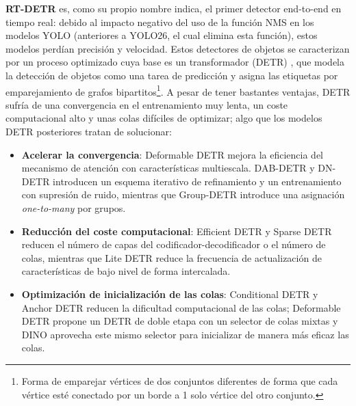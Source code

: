 \documentclass[12pt,a4paper,onecolumn,oneside]{report}
\begin{document}
\textbf{RT-DETR} \cite{zhao2024detrsbeatyolosrealtime} es, como su propio nombre indica, el primer detector end-to-end en tiempo real: debido al impacto negativo del uso de la función NMS en los modelos YOLO (anteriores a YOLO26, el cual elimina esta función), estos modelos perdían precisión y velocidad. Estos detectores de objetos se caracterizan por un proceso optimizado cuya base es un transformador (DETR) \cite{carion2020endtoendobjectdetectiontransformers}, que modela la detección de objetos como una tarea de predicción y asigna las etiquetas por emparejamiento de grafos bipartitos\footnote{Forma de emparejar vértices de dos conjuntos diferentes de forma que cada vértice esté conectado por un borde a 1 solo vértice del otro conjunto.}. A pesar de tener bastantes ventajas, DETR sufría de una convergencia en el entrenamiento muy lenta, un coste computacional alto y unas colas difíciles de optimizar; algo que los modelos DETR posteriores tratan de solucionar: 
\begin{itemize}
    \item \textbf{Acelerar la convergencia}: Deformable DETR \cite{zhu2021deformabledetrdeformabletransformers} mejora la eficiencia del mecanismo de atención con características multiescala. DAB-DETR \cite{liu2022dabdetrdynamicanchorboxes} y DN-DETR \cite{li2022dndetracceleratedetrtraining} introducen un esquema iterativo de refinamiento y un entrenamiento con supresión de ruido, mientras que Group-DETR \cite{chen2023groupdetrfastdetr} introduce una asignación \textit{one-to-many} por grupos.
    \item \textbf{Reducción del coste computacional}: Efficient DETR \cite{yao2021efficientdetrimprovingendtoend} y Sparse DETR \cite{roh2022sparsedetrefficientendtoend} reducen el número de capas del codificador-decodificador o el número de colas, mientras que Lite DETR \cite{li2023litedetrinterleaved} reduce la frecuencia de actualización de características de bajo nivel de forma intercalada.
    \item \textbf{Optimización de inicialización de las colas}: Conditional DETR \cite{meng2023conditionaldetrfasttraining} y Anchor DETR \cite{wang2022anchordetrquerydesign} reducen la dificultad computacional de las colas; Deformable DETR \cite{zhu2021deformabledetrdeformabletransformers} propone un DETR de doble etapa con un selector de colas mixtas y DINO \cite{zhang2022dinodetrimproveddenoising} aprovecha este mismo selector para inicializar de manera más eficaz las colas.
\end{itemize}
\end{document}
